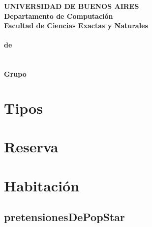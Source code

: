 \documentclass[a4paper]{article}
\begin{document}
\begin{center}
	{\textbf{\large UNIVERSIDAD DE BUENOS AIRES}}\\[1.5em]
	{\textbf{\large Departamento de Computaci\'{o}n}}\\[1.5em]
    {\textbf{\large Facultad de Ciencias Exactas y Naturales}}\\
    \vspace{20mm}
    {\LARGE\textbf{\Materia}}\\[1em]    
    \vspace{5mm}
    {\LARGE\textbf{\cuatrimestreLindo de \elanio}}\\
    \vspace{15mm}
    {\Large \textbf{\Titulo}}\\[1em]
    \vspace{15mm}
    {\textbf{\Large \Fecha}}\\
    \vspace{15mm}
    {\textbf{\Large Grupo \Grupo}}\\
    \vspace{10mm}
    \textbf{\tablaints}
\end{center}


\newpage

\tableofcontents

\medskip

\newpage

\section{Tipos}

\vspace{0.5cm}

\section{Reserva}

\vspace{0.5cm}

\section{Habitaci\'on}


\subsection{pretensionesDePopStar}

\end{document}
